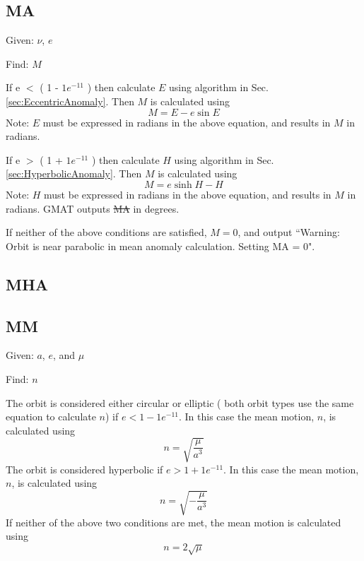 \subsection{MA} 

Given: $\nu$, $e$

\noindent Find:  $M$

\noindent If e $<$ ( 1 - $1e^{-11}$ ) then calculate $E$ using
algorithm in Sec. \ref{sec:EccentricAnomaly}.  Then $M$ is
calculated using
%
\begin{equation}
     M = E - e \sin{E}
\end{equation}
%
Note: $E$ must be expressed in radians in the above equation, and
results in $M$ in radians.

\noindent If e $>$ ( 1 + $1e^{-11}$ ) then calculate $H$ using
algorithm in Sec. \ref{sec:HyperbolicAnomaly}.  Then $M$ is
calculated using
%
\begin{equation}
     M =  e \sinh{H} - H
\end{equation}
%
Note: $H$ must be expressed in radians in the above equation, and
results in $M$ in radians.  GMAT outputs \st{MA} in degrees.

\noindent If neither of the above conditions are satisfied, $M = 0$,
and output ``Warning:  Orbit is near parabolic in mean anomaly
calculation. Setting MA = 0".

\subsection{MHA}

\subsection{MM}

Given:  $a$, $e$, and $\mu$

\noindent Find:  $n$

\noindent The orbit is considered either circular or elliptic ( both
orbit types use the same equation to calculate $n$) if $ e < 1 -
1e^{-11}$. In this case the mean motion, $n$, is calculated using
%
\begin{equation}
    n = \sqrt{\frac{\mu}{a^3}}
\end{equation}
%
The orbit is considered hyperbolic if $ e > 1 + 1e^{-11}$.  In this
case the mean motion, $n$, is calculated using
%
\begin{equation}
    n =  \sqrt{-\frac{\mu}{a^3}}
\end{equation}
%
If neither of the above two conditions are met, the mean motion is
calculated using
%
%
\begin{equation}
    n =  2\sqrt{\mu}
\end{equation}
%

